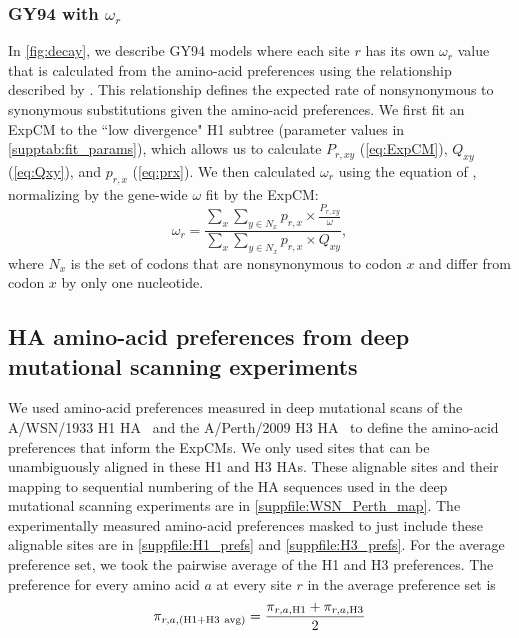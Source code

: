 \documentclass[11pt]{article}
\begin{document}
\subsubsection*{GY94 with $\omega_r$}
In \ref{fig:decay}, we describe GY94 models where each site $r$ has its own $\omega_r$ value that is calculated from the amino-acid preferences using the relationship described by \citet{spielman2015relationship}.
This relationship defines the expected rate of nonsynonymous to synonymous substitutions given the amino-acid preferences.
We first fit an ExpCM to the ``low divergence" H1 subtree (parameter values in \ref{supptab:fit_params}), which allows us to calculate $P_{r,xy}$ (\ref{eq:ExpCM}), $Q_{xy}$ (\ref{eq:Qxy}), and $p_{r,x}$ (\ref{eq:prx}).
We then calculated $\omega_r$ using the equation of \citet{spielman2015relationship}, normalizing by the gene-wide $\omega$ fit by the ExpCM:
\begin{equation}
\label{eq:w_r}
\omega_{r} = \frac{\sum_{x} \sum_{y \in N_x} {p_{r,x} \times \frac{P_{r,xy}}{\omega}}}{\sum_{x} \sum_{y \in N_x} {p_{r,x} \times Q_{xy}}},
\end{equation}
where $N_x$ is the set of codons that are nonsynonymous to codon $x$ and differ from codon $x$ by only one nucleotide. 

\subsection*{HA amino-acid preferences from deep mutational scanning experiments}
We used amino-acid preferences measured in deep mutational scans of the A/WSN/1933 H1 HA~\citep{doud2016accurate} and the A/Perth/2009 H3 HA~\citep{lee2018deep} to define the amino-acid preferences that inform the ExpCMs. 
We only used sites that can be unambiguously aligned in these H1 and H3 HAs. 
These alignable sites and their mapping to sequential numbering of the HA sequences used in the deep mutational scanning experiments are in \ref{suppfile:WSN_Perth_map}. 
The experimentally measured amino-acid preferences masked to just include these alignable sites are in \ref{suppfile:H1_prefs} and \ref{suppfile:H3_prefs}.
For the average preference set, we took the pairwise average of the H1 and H3 preferences. 
The preference for every amino acid $a$ at every site $r$ in the average preference set is
\begin{equation}
\label{eq:pi_avg}
\pi_{r,a,\rm{(H1+H3\ avg)}} = \frac{\pi_{r,a,\rm{H1}} + \pi_{r,a,\rm{H3}}}{2}
\end{equation}
\end{document}

